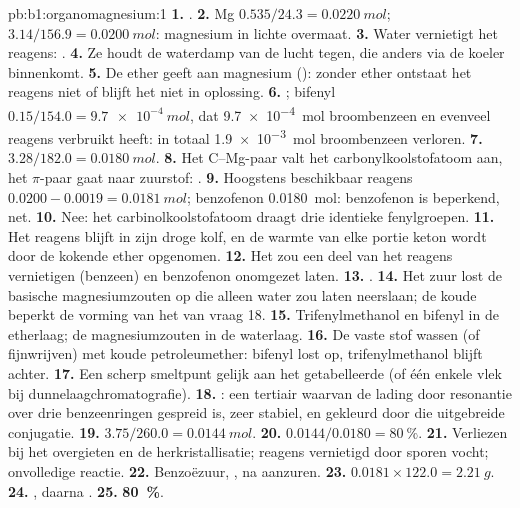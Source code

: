 \begin{solution}{pb:b1:organomagnesium:1}
\textbf{1.} .
\textbf{2.} Mg $0.535/24.3 = \qty{0.0220}{mol}$;  $3.14/156.9 =
\qty{0.0200}{mol}$: magnesium in lichte overmaat.
\textbf{3.} Water vernietigt het reagens: .
\textbf{4.} Ze houdt de waterdamp van de lucht tegen, die anders via de
koeler binnenkomt.
\textbf{5.} De ether geeft  aan magnesium (): zonder
ether ontstaat het reagens niet of blijft het niet in oplossing.
\textbf{6.} ; bifenyl
$0.15/154.0 = \qty{9.7e-4}{mol}$, dat \qty{9.7e-4}{mol} broombenzeen en
evenveel reagens verbruikt heeft: in totaal \qty{1.9e-3}{mol} broombenzeen
verloren.
\textbf{7.} $3.28/182.0 = \qty{0.0180}{mol}$.
\textbf{8.} Het C--Mg-paar valt het carbonylkoolstofatoom aan, het
$\pi$-paar gaat naar zuurstof:  .
\textbf{9.} Hoogstens beschikbaar reagens $0.0200 - 0.0019 = \qty{0.0181}{mol}$;
benzofenon \qty{0.0180}{mol}: benzofenon is beperkend, net.
\textbf{10.} Nee: het carbinolkoolstofatoom draagt drie identieke
fenylgroepen.
\textbf{11.} Het reagens blijft in zijn droge kolf, en de warmte van elke
portie keton wordt door de kokende ether opgenomen.
\textbf{12.} Het zou een deel van het reagens vernietigen (benzeen) en
benzofenon onomgezet laten.
\textbf{13.} .
\textbf{14.} Het zuur lost de basische magnesiumzouten op die alleen
water zou laten neerslaan; de koude beperkt de vorming van het 
van vraag 18.
\textbf{15.} Trifenylmethanol en bifenyl in de etherlaag; de
magnesiumzouten in de waterlaag.
\textbf{16.} De vaste stof wassen (of fijnwrijven) met koude
petroleumether: bifenyl lost op, trifenylmethanol blijft achter.
\textbf{17.} Een scherp smeltpunt gelijk aan het getabelleerde (of één
enkele vlek bij dunnelaagchromatografie).
\textbf{18.} : een tertiair
 waarvan de lading door resonantie over drie benzeenringen
gespreid is, zeer stabiel, en gekleurd door die uitgebreide conjugatie.
\textbf{19.} $3.75/260.0 = \qty{0.0144}{mol}$.
\textbf{20.} $0.0144/0.0180 = \qty{80}{\percent}$.
\textbf{21.} Verliezen bij het overgieten en de herkristallisatie;
reagens vernietigd door sporen vocht; onvolledige reactie.
\textbf{22.} Benzoëzuur, , na aanzuren.
\textbf{23.} $0.0181 \times 122.0 = \qty{2.21}{g}$.
\textbf{24.} , daarna
.
\textbf{25.} \textbf{\qty{80}{\percent}}.
\end{solution}
